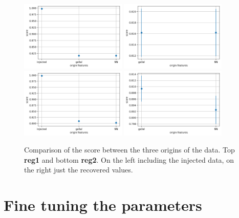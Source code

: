 \documentclass[prd,aps,twocolumn,a4paper,showkeys,nofootinbib]{revtex4-2}
\begin{document}
\begin{figure}[]
\centering
\includegraphics[width=0.45\textwidth]{./FigsClass/reg1_comparison}
\includegraphics[width=0.45\textwidth]{./FigsClass/reg1_comparisonRecovered}
\includegraphics[width=0.45\textwidth]{./FigsClass/reg2_comparison}
\includegraphics[width=0.45\textwidth]{./FigsClass/reg2_comparisonRecovered}
\caption{\label{fig:compareFirstTry} Comparison of the score between the three origins of the data. Top \textbf{reg1} and bottom \textbf{reg2}. On the left including the injected data, on the right just the recovered values.}
\end{figure}


\section{Fine tuning the parameters}
\end{document}
